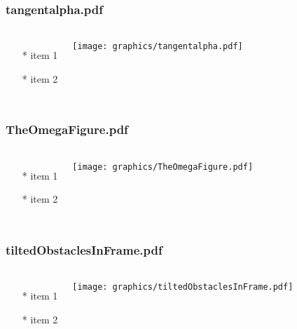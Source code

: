 \begin{frame} \frametitle{tangentalpha.pdf}
    \begin{columns}[c]
        \begin{itemize}
            \item[*] item 1
            \item[*] item 2
        \end{itemize}
        \begin{minipage}{\linewidth}
            \begin{center}
            \texttt{[image: graphics/tangentalpha.pdf]}
            \label{gfx:tangentalpha.pdf}
            \end{center}
        \end{minipage}
    \end{columns}
\end{frame}
\begin{frame} \frametitle{TheOmegaFigure.pdf}
    \begin{columns}[c]
        \begin{itemize}
            \item[*] item 1
            \item[*] item 2
        \end{itemize}
        \begin{minipage}{\linewidth}
            \begin{center}
            \texttt{[image: graphics/TheOmegaFigure.pdf]}
            \label{gfx:TheOmegaFigure.pdf}
            \end{center}
        \end{minipage}
    \end{columns}
\end{frame}
\begin{frame} \frametitle{tiltedObstaclesInFrame.pdf}
    \begin{columns}[c]
        \begin{itemize}
            \item[*] item 1
            \item[*] item 2
        \end{itemize}
        \begin{minipage}{\linewidth}
            \begin{center}
            \texttt{[image: graphics/tiltedObstaclesInFrame.pdf]}
            \label{gfx:tiltedObstaclesInFrame.pdf}
            \end{center}
        \end{minipage}
    \end{columns}
\end{frame}
